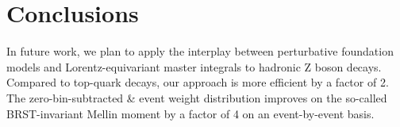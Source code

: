 \section{Conclusions}\label{sec:conclusions}

In future work, we plan to apply the interplay between perturbative
foundation models and Lorentz-equivariant master integrals to hadronic Z
boson decays. Compared to top-quark decays, our approach is more
efficient by a factor of 2. The zero-bin-subtracted & event weight
distribution improves on the so-called BRST-invariant Mellin moment by a
factor of 4 on an event-by-event basis.


